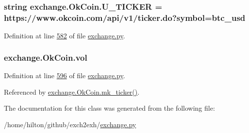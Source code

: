 \subsubsection[{\texorpdfstring{U\+\_\+\+T\+I\+C\+K\+ER}{U_TICKER}}]{\setlength{\rightskip}{0pt plus 5cm}string exchange.\+Ok\+Coin.\+U\+\_\+\+T\+I\+C\+K\+ER = \textquotesingle{}https\+://www.\+okcoin.\+com/api/v1/ticker.\+do?symbol=btc\+\_\+usd\textquotesingle{}\hspace{0.3cm}{\ttfamily [static]}}\hypertarget{classexchange_1_1_ok_coin_a81305ced2eb23b94feb7195d1d42afc2}{}\label{classexchange_1_1_ok_coin_a81305ced2eb23b94feb7195d1d42afc2}


Definition at line \hyperlink{exchange_8py_source_l00582}{582} of file \hyperlink{exchange_8py_source}{exchange.\+py}.

\subsubsection[{\texorpdfstring{vol}{vol}}]{\setlength{\rightskip}{0pt plus 5cm}exchange.\+Ok\+Coin.\+vol}\hypertarget{classexchange_1_1_ok_coin_ad0e78d6b3c0a24504be72a0216fc6549}{}\label{classexchange_1_1_ok_coin_ad0e78d6b3c0a24504be72a0216fc6549}


Definition at line \hyperlink{exchange_8py_source_l00596}{596} of file \hyperlink{exchange_8py_source}{exchange.\+py}.



Referenced by \hyperlink{exchange_8py_source_l00614}{exchange.\+Ok\+Coin.\+mk\+\_\+ticker()}.



The documentation for this class was generated from the following file\+:\begin{DoxyCompactItemize}
\item 
/home/hilton/github/exch2exh/\hyperlink{exchange_8py}{exchange.\+py}\end{DoxyCompactItemize}
